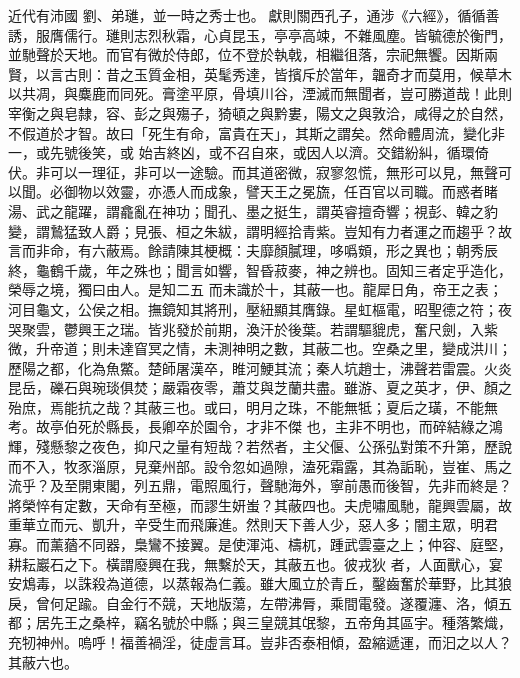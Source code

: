 \begin{pinyinscope}
 近代有沛國
 劉、弟璡，並一時之秀士也。獻則關西孔子，通涉《六經》，循循善誘，服膺儒行。璡則志烈秋霜，心貞昆玉，亭亭高竦，不雜風塵。皆毓德於衡門，並馳聲於天地。而官有微於侍郎，位不登於執戟，相繼徂落，宗祀無饗。因斯兩賢，以言古則：昔之玉質金相，英髦秀達，皆擯斥於當年，韞奇才而莫用，候草木以共凋，與麋鹿而同死。膏塗平原，骨填川谷，湮滅而無聞者，豈可勝道哉！此則宰衡之與皂隸，容、彭之與殤子，猗頓之與黔婁，陽文之與敦洽，咸得之於自然，不假道於才智。故曰「死生有命，富貴在天」，其斯之謂矣。然命體周流，變化非一，或先號後笑，或
 始吉終凶，或不召自來，或因人以濟。交錯紛糾，循環倚伏。非可以一理征，非可以一途驗。而其道密微，寂寥忽慌，無形可以見，無聲可以聞。必御物以效靈，亦憑人而成象，譬天王之冕旒，任百官以司職。而惑者睹湯、武之龍躍，謂龕亂在神功；聞孔、墨之挺生，謂英睿擅奇響；視彭、韓之豹變，謂鷙猛致人爵；見張、桓之朱紱，謂明經拾青紫。豈知有力者運之而趨乎？故言而非命，有六蔽焉。餘請陳其梗概：夫靡顏膩理，哆噅頞，形之異也；朝秀辰終，龜鶴千歲，年之殊也；聞言如響，智昏菽麥，神之辨也。固知三者定乎造化，榮辱之境，獨曰由人。是知二五
 而未識於十，其蔽一也。龍犀日角，帝王之表；河目龜文，公侯之相。撫鏡知其將刑，壓紐顯其膺錄。星虹樞電，昭聖德之符；夜哭聚雲，鬱興王之瑞。皆兆發於前期，渙汗於後葉。若謂驅貔虎，奮尺劍，入紫微，升帝道；則未達窅冥之情，未測神明之數，其蔽二也。空桑之里，變成洪川；歷陽之都，化為魚鱉。楚師屠漢卒，睢河鯁其流；秦人坑趙士，沸聲若雷震。火炎昆岳，礫石與琬琰俱焚；嚴霜夜零，蕭艾與芝蘭共盡。雖游、夏之英才，伊、顏之殆庶，焉能抗之哉？其蔽三也。或曰，明月之珠，不能無牴；夏后之璜，不能無考。故亭伯死於縣長，長卿卒於園令，才非不傑
 也，主非不明也，而碎結綠之鴻輝，殘懸黎之夜色，抑尺之量有短哉？若然者，主父偃、公孫弘對策不升第，歷說而不入，牧豕淄原，見棄州部。設令忽如過隙，溘死霜露，其為詬恥，豈崔、馬之流乎？及至開東閣，列五鼎，電照風行，聲馳海外，寧前愚而後智，先非而終是？將榮悴有定數，天命有至極，而謬生妍蚩？其蔽四也。夫虎嘯風馳，龍興雲屬，故重華立而元、凱升，辛受生而飛廉進。然則天下善人少，惡人多；闇主眾，明君寡。而薰蕕不同器，梟鸞不接翼。是使渾沌、檮杌，踵武雲臺之上；仲容、庭堅，耕耘巖石之下。橫謂廢興在我，無繫於天，其蔽五也。彼戎狄
 者，人面獸心，宴安鴆毒，以誅殺為道德，以蒸報為仁義。雖大風立於青丘，鑿齒奮於華野，比其狼戾，曾何足踰。自金行不競，天地版蕩，左帶沸脣，乘間電發。遂覆瀍、洛，傾五都；居先王之桑梓，竊名號於中縣；與三皇競其氓黎，五帝角其區宇。種落繁熾，充牣神州。嗚呼！福善禍淫，徒虛言耳。豈非否泰相傾，盈縮遞運，而汩之以人？其蔽六也。




\end{pinyinscope}
